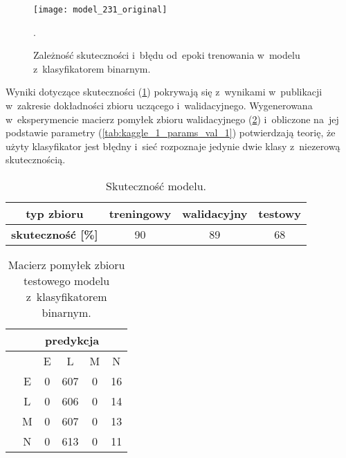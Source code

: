 {\begin{itemize}
\begin{figure}[h!]
	\centering
	\centering
		\texttt{[image: model\_231\_original]}	
	\caption{Zależność skuteczności i~błędu od~epoki trenowania w~modelu z~klasyfikatorem binarnym.}.
	\label{fig:kaggle_1_acc_loss_trening}
\end{figure}

Wyniki dotyczące skuteczności (\ref{tab:kaggle_1_acc}) pokrywają się z~wynikami w~publikacji w~zakresie dokładności zbioru uczącego i~walidacyjnego. Wygenerowana w~eksperymencie macierz pomyłek zbioru walidacyjnego (\ref{tab:kaggle_1_conf_matrix_val_1}) i~obliczone na~jej podstawie parametry (\ref{tab:kaggle_1_params_val_1}) potwierdzają teorię, że użyty klasyfikator jest błędny i~sieć rozpoznaje jedynie dwie klasy z~niezerową skutecznością.

\begin{table}[h!]
\centering
\caption[Short Heading]{Skuteczność modelu.}
\label{tab:kaggle_1_acc}
\begin{tabular}{|c|c|c|c|}
\hline
\textbf{typ zbioru}           & \textbf{treningowy} & \textbf{walidacyjny} & \textbf{testowy} \\ \hline
\textbf{skuteczność {[}\%{]}} & 90                  & 89                   & 68               \\ \hline
\end{tabular}
\end{table}

\begin{table}[h!]
\centering
\caption[Short Heading]{Macierz pomyłek zbioru testowego modelu z~klasyfikatorem binarnym.}
\label{tab:kaggle_1_conf_matrix_val_1}
\begin{tabular}{|c|c|c|c|c|c|}
\hline
\textbf{}                           & \multicolumn{5}{c|}{\textbf{predykcja}} \\ \hline
{\multirow{5}{*}{\rotatebox[origin=c]{90}{\textbf{klasa}}}} &         & E       & L        & M      & N       \\ \cline{2-6} 
                                    & E       & 0       & 607      & 0      & 16      \\ \cline{2-6} 
                                    & L       & 0       & 606      & 0      & 14      \\ \cline{2-6} 
                                    & M       & 0       & 607      & 0      & 13      \\ \cline{2-6} 
                                    & N       & 0       & 613      & 0      & 11       \\ \hline
\end{tabular}
\end{table}


\end{itemize}}
